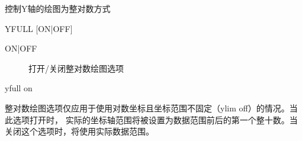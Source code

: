 \label{cmd:yfull}

控制Y轴的绘图为整对数方式

\begin{SACSTX}
YFULL [ON|OFF]
\end{SACSTX}

\begin{description}
\item [ON|OFF] 打开/关闭整对数绘图选项
\end{description}

\begin{SACDFT}
yfull on
\end{SACDFT}

整对数绘图选项仅应用于使用对数坐标且坐标范围不固定（ylim off）的情况。当此选项打开时，
实际的坐标轴范围将被设置为数据范围前后的第一个整十数。当关闭这个选项时，将使用实际数据范围。

